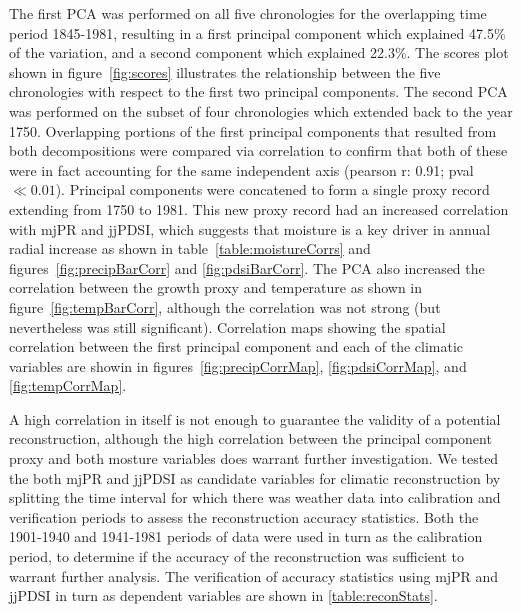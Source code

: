 \documentclass[11pt]{article}
\begin{document}
The first PCA was performed on all five chronologies for the overlapping time period 1845-1981, resulting in a first principal component which explained 47.5\% of the variation, and a second component which explained 22.3\%. The scores plot shown in figure~\ref{fig:scores} illustrates the relationship between the five chronologies with respect to the first two principal components. The second PCA was performed on the subset of four chronologies which extended back to the year 1750. Overlapping portions of the first principal components that resulted from both decompositions were compared via correlation to confirm that both of these were in fact accounting for the same independent axis (pearson r: 0.91; pval $\ll 0.01$). Principal components were concatened to form a single proxy record extending from 1750 to 1981. This new proxy record had an increased correlation with mjPR and jjPDSI, which suggests that moisture is a key driver in annual radial increase as shown in table~\ref{table:moistureCorrs} and figures~\ref{fig:precipBarCorr} and \ref{fig:pdsiBarCorr}. The PCA also increased the correlation between the growth proxy and temperature as shown in figure~\ref{fig:tempBarCorr}, although the correlation was not strong (but nevertheless was still significant). Correlation maps showing the spatial correlation between the first principal component and each of the climatic variables are showin in figures~\ref{fig:precipCorrMap}, \ref{fig:pdsiCorrMap}, and \ref{fig:tempCorrMap}.

A high correlation in itself is not enough to guarantee the validity of a potential reconstruction, although the high correlation between the principal component proxy and both mosture variables does warrant further investigation. We tested the both mjPR and jjPDSI as candidate variables for climatic reconstruction by splitting the time interval for which there was weather data into calibration and verification periods to assess the reconstruction accuracy statistics. Both the 1901-1940 and 1941-1981 periods of data were used in turn as the calibration period, to determine if the accuracy of the reconstruction was sufficient to warrant further analysis. The verification of accuracy statistics using mjPR and jjPDSI in turn as dependent variables are shown in \ref{table:reconStats}. 
\end{document}
